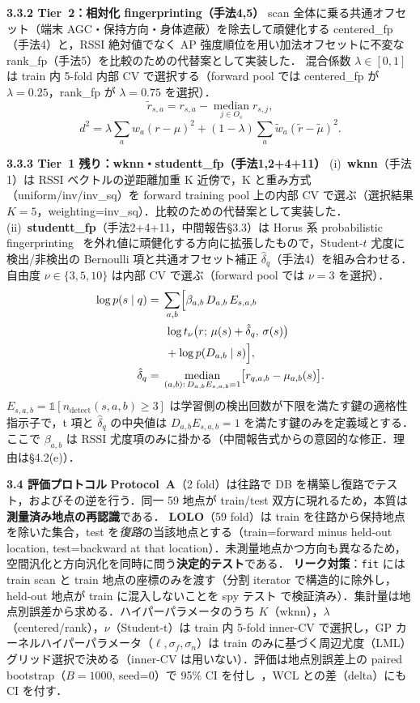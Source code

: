 \documentclass[a4paper,twocolumn]{ltjsarticle}
\begin{document}
\smallskip\noindent\textbf{3.3.2\; Tier~2：相対化 fingerprinting（手法4,5）}\;
scan 全体に乗る共通オフセット（端末 AGC・保持方向・身体遮蔽）を除去して頑健化する centered\_fp（手法4）と，RSSI 絶対値でなく AP 強度順位を用い加法オフセットに不変な rank\_fp（手法5）を比較のための代替案として実装した．
混合係数 $\lambda\in[0,1]$ は train 内 5-fold 内部 CV で選択する（forward pool では centered\_fp が $\lambda{=}0.25$，rank\_fp が $\lambda{=}0.75$ を選択）．
\[
  \tilde{r}_{s,a}=r_{s,a}-\operatorname*{median}_{j\in O_s} r_{s,j},
\]
\[
  d^2=\lambda\sum_a w_a(r-\mu)^2+(1-\lambda)\sum_a \tilde{w}_a(\tilde{r}-\tilde{\mu})^2 .
\]

\smallskip\noindent\textbf{3.3.3\; Tier~1 残り：wknn・studentt\_fp（手法1,2+4+11）}\;
(i)~\textbf{wknn}（手法1）は RSSI ベクトルの逆距離加重 K 近傍で，K と重み方式（uniform/inv/inv\_sq）を forward training pool 上の内部 CV で選ぶ（選択結果 $K{=}5$，weighting=inv\_sq）．比較のための代替案として実装した．
(ii)~\textbf{studentt\_fp}（手法2+4+11，中間報告§3.3）は Horus 系 probabilistic fingerprinting~\cite{youssef2005horus} を外れ値に頑健化する方向に拡張したもので，Student-$t$ 尤度に検出/非検出の Bernoulli 項と共通オフセット補正 $\hat{\delta}_q$（手法4）を組み合わせる．自由度 $\nu\in\{3,5,10\}$ は内部 CV で選ぶ（forward pool では $\nu{=}3$ を選択）．
\begin{align*}
  \log p(s\mid q) ={}&\sum_{a,b}\Bigl[\beta_{a,b}\,D_{a,b}\,E_{s,a,b}\\
    &\;\log t_\nu\bigl(r;\,\mu(s)+\hat{\delta}_q,\,\sigma(s)\bigr)\\
    &\;+\log p(D_{a,b}\mid s)\Bigr],\\
  \hat{\delta}_q ={}&\operatorname*{median}_{(a,b):\,D_{a,b}E_{s,a,b}=1}\bigl[r_{q,a,b}-\mu_{a,b}(s)\bigr].
\end{align*}
$E_{s,a,b}=\mathbb{1}[n_{\mathrm{detect}}(s,a,b)\geq 3]$ は学習側の検出回数が下限を満たす鍵の適格性指示子で，t 項と $\hat{\delta}_q$ の中央値は $D_{a,b}E_{s,a,b}=1$ を満たす鍵のみを定義域とする．
ここで $\beta_{a,b}$ は RSSI 尤度項のみに掛かる（中間報告式からの意図的な修正．理由は§4.2(e)）．

\smallskip\noindent\textbf{3.4\; 評価プロトコル}\;
\textbf{Protocol~A}（2 fold）は往路で DB を構築し復路でテスト，およびその逆を行う．同一 59 地点が train/test 双方に現れるため，本質は\textbf{測量済み地点の再認識}である．
\textbf{LOLO}（59 fold）は train を往路から保持地点を除いた集合，test を\emph{復路}の当該地点とする（train=forward minus held-out location, test=backward at that location）．未測量地点かつ方向も異なるため，空間汎化と方向汎化を同時に問う\textbf{決定的テスト}である．
\textbf{リーク対策}：\texttt{fit} には train scan と train 地点の座標のみを渡す（分割 iterator で構造的に除外し，held-out 地点が train に混入しないことを spy テスト  で検証済み）．集計量は地点別誤差から求める．ハイパーパラメータのうち $K$（wknn），$\lambda$（centered/rank），$\nu$（Student-t）は train 内 5-fold inner-CV で選択し，GP カーネルハイパーパラメータ（$\ell,\sigma_f,\sigma_n$）は train のみに基づく周辺尤度（LML）グリッド選択で決める（inner-CV は用いない）．評価は地点別誤差上の paired bootstrap（$B{=}1000$, seed=0）で 95\% CI を付し~\cite{hara2010statloc}，WCL との差（delta）にも CI を付す．
\end{document}
